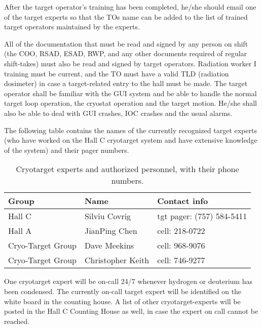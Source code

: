 {After the target operator's training has been completed, he/she should
email one of the target experts so that the TOs name can be added to
the list of trained target operators maintained by the experts.

All of the documentation that must be read and signed by any person on
shift (the COO, RSAD, ESAD, RWP, and any other documents required of
regular shift-takes) must also be read and signed by target operators.
Radiation worker I training must be current, and the TO must have a
valid TLD (radiation dosimeter) in case a target-related entry to the
hall must be made. The target operator shall be familiar with the GUI
system and be able to handle the normal target loop operation, the
cryostat operation and the target motion. He/she shall also be able to
deal with GUI crashes, IOC crashes and the usual alarms.


\begin{safetyen}{0}{0} 

The following table contains the names of the currently recognized
target experts (who have worked on the Hall C cryotarget system and
have extensive knowledge of the system) and their pager numbers.


\begin{table}[h]
\centering
\begin{tabular}{| l | l | l | }
\hline
Group & Name & Contact info    \\ \hline
Hall C & Silviu Covrig & tgt pager: (757) 584-5411 \\ \hline 
Hall A & JianPing Chen & cell: 218-0722 \\ \hline
Cryo-Target Group & Dave Meekins & cell: 968-9076 \\ \hline 
Cryo-Target Group& Christopher Keith & cell: 746-9277 \\ \hline
\end{tabular}
\caption{Cryotarget experts and authorized personnel, with their phone numbers.}
\label{tab:cryotarg:personnel-con}
\end{table}

One cryotarget expert will be on-call 24/7 whenever hydrogen or
deuterium has been condensed.
The currently on-call target expert will be identified on the white board in the counting house. A list of other cryotarget-experts will be posted
in the Hall C Counting House as well, in case the expert on call cannot be reached.
\end{safetyen}
}


